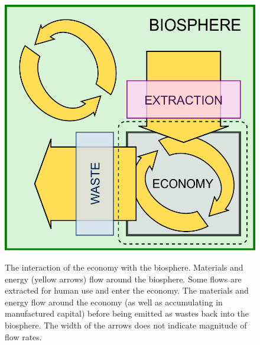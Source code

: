 

\begin{figure}[!ht]
\centering\
\includegraphics[width=\linewidth]{Part_0/Chapter_Introduction/images/Biosphere_economy.pdf}
\caption[The biosphere and the economy **** MCD - NEED A BETTER FIGURE TITLE ****]
				{The interaction of the economy with the biosphere.
				Materials and energy (yellow arrows) flow around the biosphere.
				Some flows are extracted for human use and enter the economy.
				The materials and energy flow around the economy 
				(as well as accumulating in manufactured capital)
				before being emitted as wastes back into the biosphere.
				The width of the arrows does not indicate magnitude of flow rates.}
\label{fig:biosphere_economy}
\end{figure}




